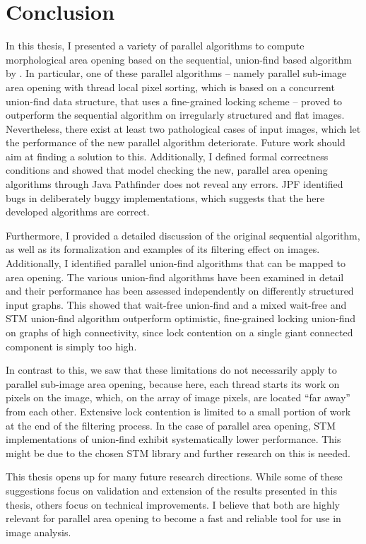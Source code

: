 \chapter{Conclusion}
\label{chpt:conclusion}

In this thesis, I presented a variety of parallel algorithms to compute
morphological area opening based on the sequential, union-find based algorithm
by \citet{Meijster2002Comparison}. In particular, one of these parallel
algorithms -- namely parallel sub-image area opening with thread local pixel
sorting, which is based on a concurrent union-find data structure, that uses a
fine-grained locking scheme -- proved to outperform the sequential algorithm on
irregularly structured and flat images. Nevertheless, there exist at least two
pathological cases of input images, which let the performance of the new
parallel algorithm deteriorate. Future work should aim at finding a solution to
this. Additionally, I defined formal correctness conditions and showed that
model checking the new, parallel area opening algorithms through Java Pathfinder
\cite{Visser2003Model} does not reveal any errors. JPF identified bugs in
deliberately buggy implementations, which suggests that the here developed
algorithms are correct.

Furthermore, I provided a detailed discussion of the original sequential
algorithm, as well as its formalization and examples of its filtering effect on
images. Additionally, I identified parallel union-find algorithms that can be
mapped to area opening. The various union-find algorithms have been examined in
detail and their performance has been assessed independently on differently
structured input graphs. This showed that wait-free union-find and a mixed
wait-free and STM union-find algorithm outperform optimistic, fine-grained
locking union-find on graphs of high connectivity, since lock contention on a
single giant connected component is simply too high.

In contrast to this, we saw that these limitations do not necessarily apply to
parallel sub-image area opening, because here, each thread starts its work on
pixels on the image, which, on the array of image pixels, are located ``far
away'' from each other. Extensive lock contention is limited to a small portion
of work at the end of the filtering process. In the case of parallel area
opening, STM implementations of union-find exhibit systematically lower
performance. This might be due to the chosen STM library and further research on
this is needed.

This thesis opens up for many future research directions. While some of these
suggestions focus on validation and extension of the results presented in this
thesis, others focus on technical improvements. I believe that both are highly
relevant for parallel area opening to become a fast and reliable tool for use in
image analysis.

